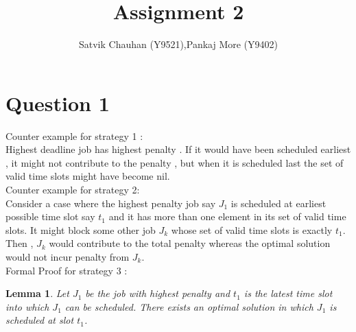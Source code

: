 \documentclass[11pt]{article}
\title{Assignment 2}
\author{Satvik Chauhan (Y9521),Pankaj More (Y9402)}
\newtheorem{lemma}[theorem]{Lemma}
\begin{document}
\maketitle
\section*{Question 1}
Counter example for strategy 1 : \\
Highest deadline job has highest penalty . If it would have been scheduled earliest , it might not contribute to the penalty , but when it is scheduled last the set of valid time slots might have become nil. \\
Counter example for strategy 2: \\
Consider a case where the highest penalty job say $J_1$ is scheduled at earliest possible time slot say $t_1$ and it has more than one element in its set of valid time slots. It might block some other job $J_k$ whose set of valid time slots is exactly $t_1$. Then , $J_k$ would contribute to the total penalty whereas the optimal solution would not incur penalty from $J_k$.  \\
Formal Proof for strategy 3 : 
\begin{lemma}
Let $J_{1}$ be the job with highest penalty and $t_{1}$ is the latest time slot into which $J_{1}$ can be scheduled.
There exists an optimal solution in which $J_{1}$ is scheduled at slot $t_{1}$.
\end{lemma}
\end{document}
